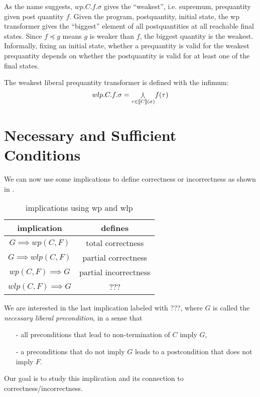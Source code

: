 As the name suggests, $wp.C.f.\sigma$ gives the ``weakest'', i.e. supremum, prequantity given post quantity $f$.
Given the program, postquantity, initial state, the wp transformer gives the ``biggest'' element of all postquantities at all reachable final states.
Since $f\preceq g$ means $g$ is weaker than $f$, the biggest quantity is the weakest.
Informally, fixing an initial state, whether a prequantity is valid for the weakest prequantity depends on whether the postquantity is valid for at least one of the final states.
\begin{comment}
Note that supremum can be not an element of the infinite set.
\end{comment}

The weakest liberal prequantity transformer is defined with the infimum:
\[wlp.C.f.\sigma = \underset{\tau\in\llbracket {C} \rrbracket(\sigma)}{\varcurlywedge} f(\tau)\]

\section{Necessary and Sufficient Conditions}
We can now use some implications to define correctness or incorrectness as shown in .
\begin{table}\centering
    \begin{tabular}{cc}
      \textbf{implication}&\textbf{defines}    \\ \hline
      $G\implies wp(C,F)$&   total correctness   \\
      $G\implies wlp(C,F)$&  partial correctness\\
      $wp(C,F)\implies G$&  partial incorrectness\\
      $wlp(C,F)\implies G$&  ???\\
    \end{tabular}
    \caption{implications using wp and wlp\cite{Zhang2022}}
    \label{tab:impl}
\end{table}

We are interested in the last implication labeled with ???, where $G$ is called the \textit{necessary liberal precondition}, in a sense that
\begin{itemize}
    \item [-] all preconditions that lead to non-termination of $C$ imply $G$,
    \item [-] a preconditions that do not imply $G$ leads to a postcondition that does not imply $F$.
\end{itemize}
Our goal is to study this implication and its connection to correctness/incorrectness.



